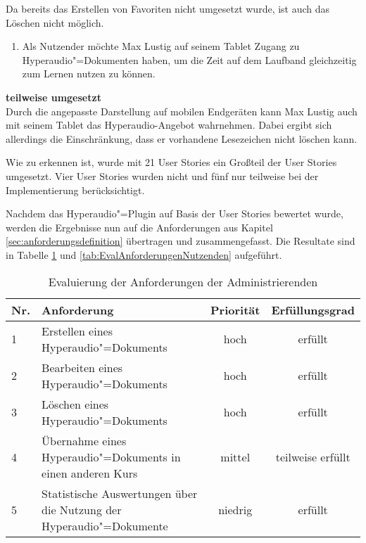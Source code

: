 Da bereits das Erstellen von Favoriten nicht umgesetzt wurde, ist auch das Löschen nicht möglich.
\vspace{0.25cm}
\begin{enumerate}[resume*]
\item \label{US-Zeit-Mobil-Eval} Als Nutzender möchte Max Lustig auf seinem Tablet Zugang zu Hyperaudio"=Dokumenten haben, um die Zeit auf dem Laufband gleichzeitig zum Lernen nutzen zu können.
\end{enumerate}
\vspace{-0.1cm}
\textbf{teilweise umgesetzt}\\
Durch die angepasste Darstellung auf mobilen Endgeräten kann Max Lustig auch mit seinem Tablet das Hyperaudio-Angebot wahrnehmen. Dabei ergibt sich allerdings die Einschränkung, dass er vorhandene Lesezeichen nicht löschen kann.

Wie zu erkennen ist, wurde mit 21 User Stories ein Großteil der User Stories umgesetzt. Vier User Stories wurden nicht und fünf nur teilweise bei der Implementierung berücksichtigt.

Nachdem das Hyperaudio"=Plugin auf Basis der User Stories bewertet wurde, werden die Ergebnisse nun auf die Anforderungen aus Kapitel \ref{sec:anforderungsdefinition} übertragen und zusammengefasst. Die Resultate sind in Tabelle \ref{tab:EvalAnforderungenAdministrierenden} und \ref{tab:EvalAnforderungenNutzenden} aufgeführt.

\begin{table}[!ht]
\def\arraystretch{1.4}
\caption{Evaluierung der Anforderungen der Administrierenden}
\label{tab:EvalAnforderungenAdministrierenden}
 \begin{tabularx}{\textwidth}{lXcc}      
    \hline
    Nr. & Anforderung & Priorität & Erfüllungsgrad
    \\\hline
    1 & Erstellen eines Hyperaudio"=Dokuments & hoch & erfüllt\\
    2 & Bearbeiten eines Hyperaudio"=Dokuments & hoch & erfüllt\\
    3 & Löschen eines Hyperaudio"=Dokuments & hoch & erfüllt\\
    4 & Übernahme eines Hyperaudio"=Dokuments in einen anderen Kurs & mittel & teilweise erfüllt\\
    5 & Statistische Auswertungen über die Nutzung der Hyperaudio"=Dokumente & niedrig & erfüllt\\
    \hline
    \end{tabularx}
\end{table}

